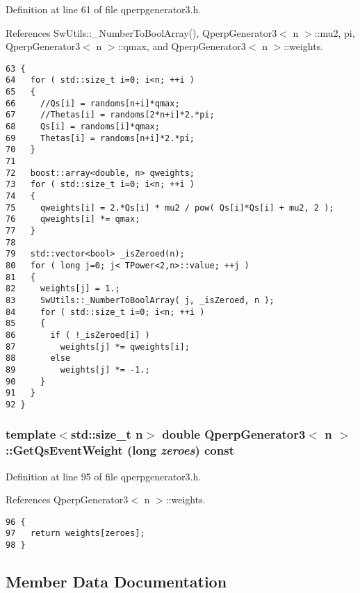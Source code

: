 Definition at line 61 of file qperpgenerator3.h.

References SwUtils::\_\-NumberToBoolArray(), QperpGenerator3$<$ n $>$::mu2, pi, QperpGenerator3$<$ n $>$::qmax, and QperpGenerator3$<$ n $>$::weights.

\begin{Code}\begin{verbatim}63 {
64   for ( std::size_t i=0; i<n; ++i )
65   {
66     //Qs[i] = randoms[n+i]*qmax;
67     //Thetas[i] = randoms[2*n+i]*2.*pi;
68     Qs[i] = randoms[i]*qmax;
69     Thetas[i] = randoms[n+i]*2.*pi;
70   }
71 
72   boost::array<double, n> qweights;
73   for ( std::size_t i=0; i<n; ++i )
74   {
75     qweights[i] = 2.*Qs[i] * mu2 / pow( Qs[i]*Qs[i] + mu2, 2 );
76     qweights[i] *= qmax;
77   }
78 
79   std::vector<bool> _isZeroed(n);
80   for ( long j=0; j< TPower<2,n>::value; ++j )
81   {
82     weights[j] = 1.;
83     SwUtils::_NumberToBoolArray( j, _isZeroed, n );
84     for ( std::size_t i=0; i<n; ++i )
85     {
86       if ( !_isZeroed[i] )
87         weights[j] *= qweights[i];
88       else
89         weights[j] *= -1.;
90     }
91   }
92 }
\end{verbatim}
\end{Code}


\subsubsection{\setlength{\rightskip}{0pt plus 5cm}template$<$std::size\_\-t n$>$ double {\bf QperpGenerator3}$<$ n $>$::GetQsEventWeight (long {\em zeroes}) const\hspace{0.3cm}{\tt  [inline]}}\label{classQperpGenerator3_fee76fe6543f1ca8f42179c52d990f76}




Definition at line 95 of file qperpgenerator3.h.

References QperpGenerator3$<$ n $>$::weights.

\begin{Code}\begin{verbatim}96 {
97   return weights[zeroes];
98 }
\end{verbatim}
\end{Code}




\subsection{Member Data Documentation}
